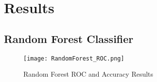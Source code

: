 \chapter*{Results}
\setcounter{chapter}{4}

\section{Random Forest Classifier}
\begin{figure}[h]
    \centering
    \texttt{[image: RandomForest\_ROC.png]}
    \caption{Random Forest ROC and Accuracy Results}
    \label{fig:example-image}
\end{figure}